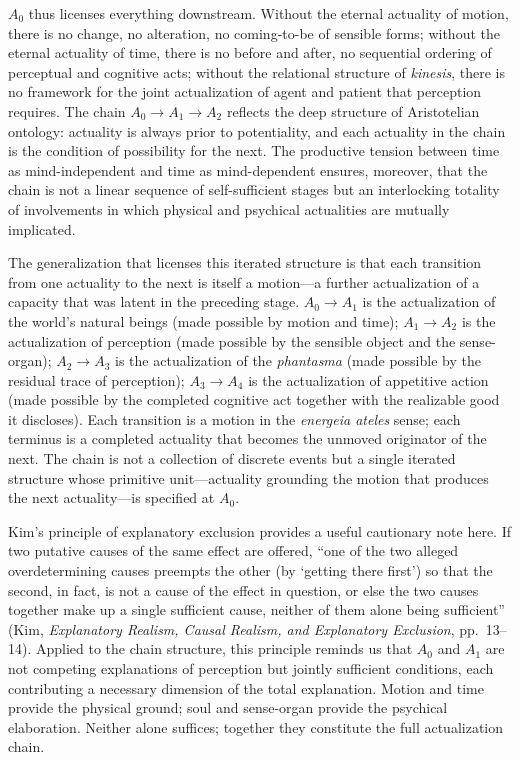 $A_0$ thus licenses everything downstream. Without the eternal actuality of motion, there is no change, no alteration, no coming-to-be of sensible forms; without the eternal actuality of time, there is no before and after, no sequential ordering of perceptual and cognitive acts; without the relational structure of \textit{kinesis}, there is no framework for the joint actualization of agent and patient that perception requires. The chain $A_0 \to A_1 \to A_2$ reflects the deep structure of Aristotelian ontology: actuality is always prior to potentiality, and each actuality in the chain is the condition of possibility for the next. The productive tension between time as mind-independent and time as mind-dependent ensures, moreover, that the chain is not a linear sequence of self-sufficient stages but an interlocking totality of involvements in which physical and psychical actualities are mutually implicated.

The generalization that licenses this iterated structure is that each transition from one actuality to the next is itself a motion---a further actualization of a capacity that was latent in the preceding stage. $A_0 \to A_1$ is the actualization of the world's natural beings (made possible by motion and time); $A_1 \to A_2$ is the actualization of perception (made possible by the sensible object and the sense-organ); $A_2 \to A_3$ is the actualization of the \textit{phantasma} (made possible by the residual trace of perception); $A_3 \to A_4$ is the actualization of appetitive action (made possible by the completed cognitive act together with the realizable good it discloses). Each transition is a motion in the \textit{energeia ateles} sense; each terminus is a completed actuality that becomes the unmoved originator of the next. The chain is not a collection of discrete events but a single iterated structure whose primitive unit---actuality grounding the motion that produces the next actuality---is specified at $A_0$.

Kim's principle of explanatory exclusion provides a useful cautionary note here. If two putative causes of the same effect are offered, ``one of the two alleged overdetermining causes preempts the other (by `getting there first') so that the second, in fact, is not a cause of the effect in question, or else the two causes together make up a single sufficient cause, neither of them alone being sufficient'' (Kim, \textit{Explanatory Realism, Causal Realism, and Explanatory Exclusion}, pp.~13--14). Applied to the chain structure, this principle reminds us that $A_0$ and $A_1$ are not competing explanations of perception but jointly sufficient conditions, each contributing a necessary dimension of the total explanation. Motion and time provide the physical ground; soul and sense-organ provide the psychical elaboration. Neither alone suffices; together they constitute the full actualization chain.

